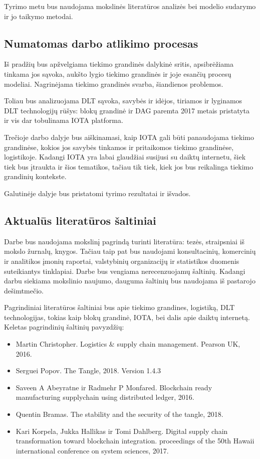\documentclass{VUMIFPSkursinis}
\begin{document}
Tyrimo metu bus naudojama mokslinės literatūros analizės bei modelio sudarymo ir jo taikymo metodai.

\subsection{Numatomas darbo atlikimo procesas}

Iš pradžių bus apžvelgiama tiekimo grandinės dalykinė sritis, apsibrėžiama tinkama jos sąvoka, aukšto lygio tiekimo grandinės ir joje esančių procesų modeliai. Nagrinėjama tiekimo grandinės svarba, šiandienos problemos.

Toliau bus analizuojama DLT sąvoka, savybės ir idėjos, tiriamos ir lyginamos DLT technologijų rūšys: blokų grandinė ir DAG paremta 2017 metais pristatyta ir vis dar tobulinama IOTA platforma.

Trečioje darbo dalyje bus aiškinamasi, kaip IOTA gali būti panaudojama tiekimo grandinėse, kokios jos savybės tinkamos ir pritaikomos tiekimo grandinėse, logistikoje. Kadangi IOTA yra labai glaudžiai susijusi su daiktų internetu, šiek tiek bus įtraukta ir šios tematikos, tačiau tik tiek, kiek jos bus reikalinga tiekimo grandinių kontekste.

Galutinėje dalyje bus pristatomi tyrimo rezultatai ir išvados.

\subsection{Aktualūs literatūros šaltiniai}

Darbe bus naudojama mokslinį pagrindą turinti literatūra: tezės, straipsniai iš mokslo žurnalų, knygos. Tačiau taip pat bus naudojami konsultacinių, komercinių ir analitikos įmonių raportai, valstybinių organizacijų ir statistikos duomenis suteikiantys tinklapiai.
Darbe bus vengiama nerecenzuojamų šaltinių.
Kadangi darbu siekiama mokslinio naujumo, dauguma šaltinių bus naudojama iš pastarojo dešimtmečio.

Pagrindiniai literatūros šaltiniai bus apie tiekimo grandines, logistiką, DLT technologijas, tokias kaip blokų grandinė, IOTA, bei dalis apie daiktų internetą. Keletas pagrindinių šaltinių pavyzdžių:
\begin{itemize}
    \item Martin Christopher. Logistics \& supply chain management. Pearson UK, 2016.
    \item Serguei Popov. The Tangle, 2018. Version 1.4.3
    \item Saveen A Abeyratne ir Radmehr P Monfared. Blockchain ready manufacturing supplychain using distributed ledger, 2016.
    \item Quentin Bramas. The stability and the security of the tangle, 2018.
    \item Kari Korpela, Jukka Hallikas ir Tomi Dahlberg. Digital supply chain transformation toward blockchain integration. proceedings of the 50th Hawaii international conference on system sciences, 2017.
\end{itemize}
\end{document}

